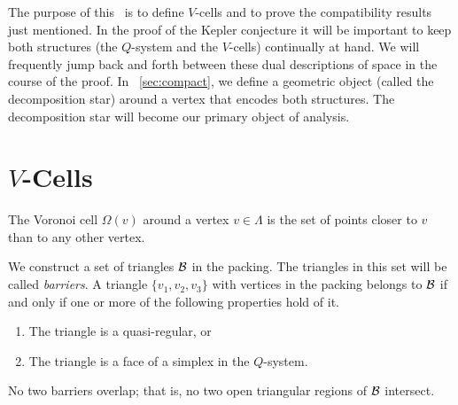The purpose of this \chap\ is to define $V$-cells and to prove the
compatibility results just mentioned.  In the proof of the Kepler
conjecture it will be important to keep both structures (the
$Q$-system and the $V$-cells) continually at hand. We will
frequently jump back and forth between these dual descriptions of
space in the course of the proof.  In \Chap~\ref{sec:compact}, we
define a geometric object (called the decomposition star) around a
vertex that encodes both structures.  The decomposition star will
become our primary object of analysis.


\section{$V$-Cells}
\label{sec:cells}




\begin{definition} \label{def:Voronoi}
    The  Voronoi cell
$\Omega(v)$ around a vertex $v\in\Lambda$ is the set of points
closer to $v$ than to any other vertex.
\end{definition}




\begin{definition}\label{def:barrier}
We construct a set of triangles ${\mathcal B}$ in the packing.  The
triangles in this set will be called {\it barriers}.
A triangle $\{v_1,v_2,v_3\}$ with vertices in the packing belongs to
${\mathcal B}$ if and only if  one or more of the following properties hold
of it.
\begin{enumerate}
    \item The triangle is a
    quasi-regular, or
    \item The triangle is a face of a simplex in the $Q$-system.
\end{enumerate}
\end{definition}

\begin{lemma}\label{lemma:barrier-no-overlap}
 No two barriers overlap; that is, no two open triangular regions of
 ${\mathcal B}$ intersect.
\end{lemma}

